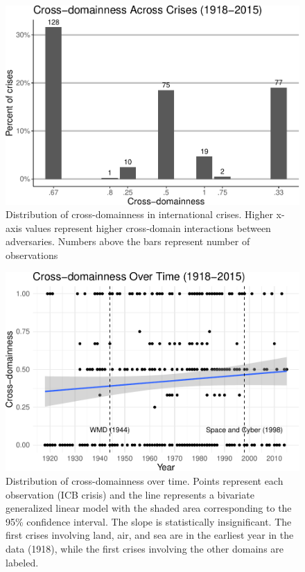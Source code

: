 \documentclass[
]{article}
\begin{document}
\begin{figure}[h!]

{\centering \includegraphics[width=0.8\linewidth,]{2022-04-07_ICB-Domains_files/figure-latex/cddness-1} 

}

\caption{Distribution of cross-domainness in international crises. Higher x-axis values represent higher cross-domain interactions between adversaries. Numbers above the bars represent number of observations}\label{fig:cddness}
\end{figure}

\begin{figure}[h!]

{\centering \includegraphics[width=0.8\linewidth,]{2022-04-07_ICB-Domains_files/figure-latex/cddness-time-1} 

}

\caption{Distribution of cross-domainness over time. Points represent each observation (ICB crisis) and the line represents a bivariate generalized linear model with the shaded area corresponding to the 95\% confidence interval. The slope is statistically insignificant. The first crises involving land, air, and sea are in the earliest year in the data (1918), while the first crises involving the other domains are labeled.}\label{fig:cddness-time}
\end{figure}
\end{document}
